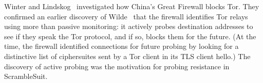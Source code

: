 \documentclass{article}
\begin{document}
Winter and Lindskog~\cite{foci12-winter} investigated how China's Great Firewall blocks Tor.
They confirmed an earlier discovery of Wilde~\cite{wilde} that the firewall identifies Tor relays using more than passive monitoring:
it actively probes destination addresses to see if they speak the Tor protocol, and if so,
blocks them for the future.
(At the time, the firewall identified connections for future probing by looking for a distinctive
list of ciphersuites sent by a Tor client in its TLS client hello.) %
The discovery of active probing was the motivation for probing resistance in ScrambleSuit.
\\


  

\end{document}
